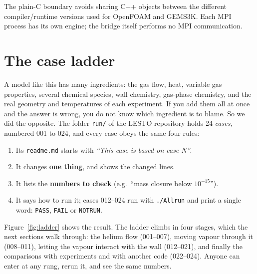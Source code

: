 \documentclass[10pt,a4paper]{article}
\begin{document}
The plain-C boundary avoids sharing C++ objects between the different
compiler/runtime versions used for OpenFOAM and GEMS3K. Each MPI process
has its own engine; the bridge itself performs no MPI communication.

\clearpage
\section{The case ladder}

A model like this has many ingredients: the gas flow, heat, variable gas
properties, several chemical species, wall chemistry, gas-phase chemistry,
and the real geometry and temperatures of each experiment. If you add them
all at once and the answer is wrong, you do not know which ingredient is to
blame. So we did the opposite. The folder \texttt{run/} of the LESTO
repository holds 24 \emph{cases}, numbered 001 to 024, and every case obeys
the same four rules:

\begin{enumerate}[itemsep=0pt,label=\textbf{\color{PSIblue}\arabic*.}]
  \item Its \texttt{readme.md} starts with \emph{``This case is based on case N''}.
  \item It changes \textbf{one thing}, and shows the changed lines.
  \item It lists the \textbf{numbers to check} (e.g.\ ``mass closure below $10^{-15}$'').
  \item It says how to run it; cases 012--024 run with \texttt{./Allrun} and
        print a single word: \texttt{PASS}, \texttt{FAIL} or \texttt{NOTRUN}.
\end{enumerate}

Figure~\ref{fig:ladder} shows the result. The ladder climbs in four stages,
which the next sections walk through: the helium flow (001--007), moving
vapour through it (008--011), letting the vapour interact with the wall
(012--021), and finally the comparisons with experiments and with another
code (022--024). Anyone can enter at any rung, rerun it, and see the same
numbers.
\end{document}

